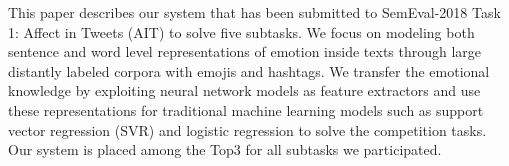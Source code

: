 This paper describes our system that has been submitted to SemEval-2018 Task 1: Affect in Tweets (AIT) to solve five subtasks. We focus on modeling both sentence and word level representations of emotion inside texts through large distantly labeled corpora with emojis and hashtags. We transfer the emotional knowledge by exploiting neural network models as feature extractors and use these representations for traditional machine learning models such as support vector regression (SVR) and logistic regression to solve the competition tasks. Our system is placed among the Top3 for all subtasks we participated.
